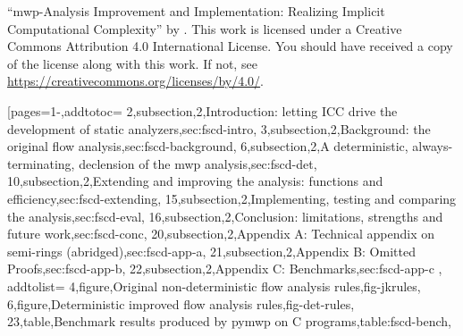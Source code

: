 \pageIconAnalysis
{}
{\par\enquote{mwp-Analysis Improvement and Implementation: Realizing Implicit Computational Complexity} \textcopyright{ }by{ }\CTNT.
\newline{}This work is licensed under a Creative Commons Attribution 4.0 International License.
\newline{}You should have received a copy of the license along with this work.
\newline{}If not, see \url{https://creativecommons.org/licenses/by/4.0/}.}
[pages={1-},addtotoc={
    2,subsection,2,{Introduction: letting ICC drive the development of static analyzers},sec:fscd-intro,
    3,subsection,2,{Background: the original flow analysis},sec:fscd-background,
    6,subsection,2,{A deterministic, always-terminating, declension of the mwp analysis},sec:fscd-det,
    10,subsection,2,{Extending and improving the analysis: functions and efficiency},sec:fscd-extending,
    15,subsection,2,{Implementing, testing and comparing the analysis},sec:fscd-eval,
    16,subsection,2,{Conclusion: limitations, strengths and future work},sec:fscd-conc,
    20,subsection,2,{Appendix A: Technical appendix on semi-rings (abridged)},sec:fscd-app-a,
    21,subsection,2,{Appendix B: Omitted Proofs},sec:fscd-app-b,
    22,subsection,2,{Appendix C: Benchmarks},sec:fscd-app-c
}, addtolist={
    4,figure,{Original non-deterministic flow analysis rules},fig-jkrules,
    6,figure,{Deterministic improved flow analysis rules},fig-det-rules,
    23,table,{Benchmark results produced by pymwp on C programs},table:fscd-bench},
